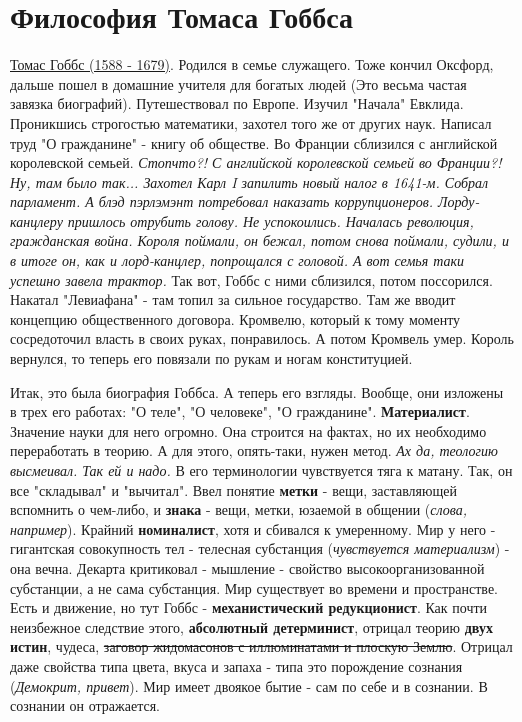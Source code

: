 \section{Философия Томаса Гоббса}
\underline{Томас Гоббс (1588 - 1679)}. Родился в семье служащего. Тоже кончил Оксфорд, дальше пошел в домашние учителя для богатых людей (Это весьма частая завязка биографий). Путешествовал по Европе.  Изучил "Начала" Евклида. Проникшись строгостью математики, захотел того же от других наук. Написал труд "О гражданине" - книгу об обществе. Во Франции сблизился с английской королевской семьей. \textit{Стопчто?! С английской королевской семьей во Франции?! Ну, там было так... Захотел Карл I запилить новый налог в 1641-м. Собрал парламент. А блэд  пэрлэмэнт потребовал наказать коррупционеров. Лорду-канцлеру пришлось отрубить голову. Не успокоились. Началась революция, гражданская война. Короля поймали, он бежал, потом снова поймали, судили, и в итоге он, как и лорд-канцлер, попрощался с головой. А вот семья таки успешно завела трактор.
} Так вот, Гоббс с ними сблизился, потом поссорился. Накатал "Левиафана" - там топил за сильное государство. Там же вводит концепцию общественного договора. Кромвелю, который к тому моменту сосредоточил власть в своих руках, понравилось. А потом Кромвель умер. Король вернулся, то теперь его повязали по рукам и ногам конституцией. 

Итак, это была биография Гоббса. А теперь его взгляды. Вообще, они изложены в трех его работах: "О теле", "О человеке", "О гражданине". \textbf{Материалист}. Значение науки для него огромно. Она строится на фактах, но их необходимо переработать в теорию. А для этого, опять-таки, нужен метод. \textit{Ах да, теологию высмеивал. Так ей и надо.} В его терминологии чувствуется тяга к матану. Так, он все "складывал" и "вычитал". Ввел понятие \textbf{метки} - вещи, заставляющей вспомнить о чем-либо, и \textbf{знака} - вещи, метки, юзаемой в общении (\textit{слова, например}). Крайний \textbf{номиналист}, хотя и  сбивался к умеренному. Мир у него - гигантская совокупность тел - телесная субстанция (\textit{чувствуется материализм}) - она вечна. Декарта критиковал - мышление - свойство высокоорганизованной субстанции, а не сама субстанция. Мир существует во времени и пространстве. Есть и движение, но тут Гоббс - \textbf{механистический редукционист}. Как почти неизбежное следствие этого, \textbf{абсолютный детерминист}, отрицал теорию \textbf{двух истин}, чудеса, \sout{заговор жидомасонов с иллюминатами и плоскую Землю}. Отрицал даже свойства типа цвета, вкуса и запаха - типа это порождение сознания (\textit{Демокрит, привет}). Мир имеет двоякое бытие - сам по себе и в сознании. В сознании он отражается. 

